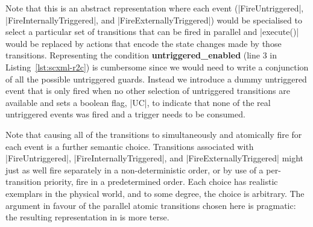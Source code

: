 Note that this is an abstract representation where each event (|FireUntriggered|, |FireInternallyTriggered|, and |FireExternallyTriggered|) would be specialised to select a particular set of transitions that can be fired in parallel and |execute()| would be replaced by actions that encode the state changes made by those transitions.
Representing the condition \textbf{untriggered\_enabled} (line 3 in Listing~\ref{lst:scxml-r2c}) is cumbersome since we would need to write a conjunction of all the possible untriggered guards. Instead we introduce a dummy untriggered event that is only fired when no other selection of untriggered transitions are available and sets a boolean flag, |UC|, to indicate that none of the real untriggered events was fired and a trigger needs to be consumed.
 
Note that causing all of the
transitions to simultaneously and atomically fire for each event is a
further semantic choice.  Transitions associated with |FireUntriggered|,
|FireInternallyTriggered|, and |FireExternallyTriggered| might
just as well fire separately in a non-deterministic order, or by use
of a per-transition priority, fire in a predetermined order.  Each
choice has realistic exemplars in the physical world, and to some
degree, the choice is arbitrary.  The argument in favour of the
parallel atomic transitions chosen here is pragmatic: the resulting
representation in \EventB is more terse.

